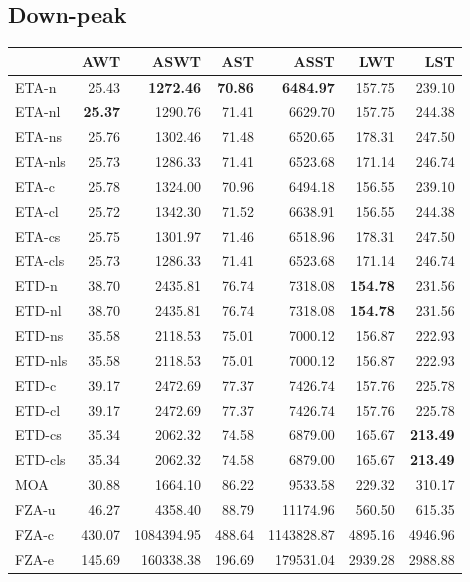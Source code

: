 \documentclass{UoYCSproject}
\begin{document}
\subsection{Down-peak}

\begin{tabular}{l | r r r r r r}
	& AWT & ASWT & AST & ASST & LWT & LST \\
	\hline
	ETA-n & 25.43 & \textbf{1272.46} & \textbf{70.86} & \textbf{6484.97} & 157.75 & 239.10 \\
	ETA-nl & \textbf{25.37} & 1290.76 & 71.41 & 6629.70 & 157.75 & 244.38 \\
	ETA-ns & 25.76 & 1302.46 & 71.48 & 6520.65 & 178.31 & 247.50 \\
	ETA-nls & 25.73 & 1286.33 & 71.41 & 6523.68 & 171.14 & 246.74 \\
	ETA-c & 25.78 & 1324.00 & 70.96 & 6494.18 & 156.55 & 239.10 \\
	ETA-cl & 25.72 & 1342.30 & 71.52 & 6638.91 & 156.55 & 244.38 \\
	ETA-cs & 25.75 & 1301.97 & 71.46 & 6518.96 & 178.31 & 247.50 \\
	ETA-cls & 25.73 & 1286.33 & 71.41 & 6523.68 & 171.14 & 246.74 \\
	\hline
	ETD-n & 38.70 & 2435.81 & 76.74 & 7318.08 & \textbf{154.78} & 231.56 \\
	ETD-nl & 38.70 & 2435.81 & 76.74 & 7318.08 & \textbf{154.78} & 231.56 \\
	ETD-ns & 35.58 & 2118.53 & 75.01 & 7000.12 & 156.87 & 222.93 \\
	ETD-nls & 35.58 & 2118.53 & 75.01 & 7000.12 & 156.87 & 222.93 \\
	ETD-c & 39.17 & 2472.69 & 77.37 & 7426.74 & 157.76 & 225.78 \\
	ETD-cl & 39.17 & 2472.69 & 77.37 & 7426.74 & 157.76 & 225.78 \\
	ETD-cs & 35.34 & 2062.32 & 74.58 & 6879.00 & 165.67 & \textbf{213.49} \\
	ETD-cls & 35.34 & 2062.32 & 74.58 & 6879.00 & 165.67 & \textbf{213.49} \\
	\hline
	MOA & 30.88 & 1664.10 & 86.22 & 9533.58 & 229.32 & 310.17 \\
	\hline
	FZA-u & 46.27 & 4358.40 & 88.79 & 11174.96 & 560.50 & 615.35 \\
	FZA-c & 430.07 & 1084394.95 & 488.64 & 1143828.87 & 4895.16 & 4946.96 \\
	FZA-e & 145.69 & 160338.38 & 196.69 & 179531.04 & 2939.28 & 2988.88
\end{tabular}
\end{document}
